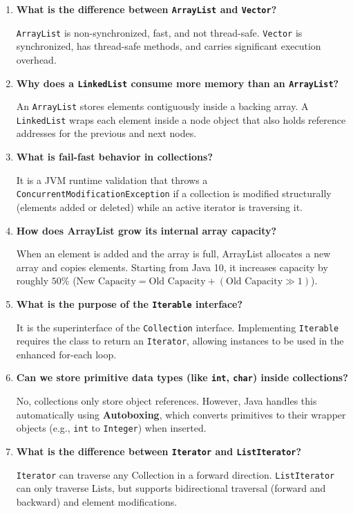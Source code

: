 \documentclass[12pt,a4paper]{article}
\newcommand{\Q}[1]{\textbf{#1}\par\noindent\ignorespaces}
\begin{document}
\begin{tcolorbox}[exambox, title={\textbf{Frequently Asked / Viva Questions}}]
\begin{enumerate}[leftmargin=*, label=\textbf{Q\arabic*.}, itemsep=5pt]
  \item \Q{What is the difference between \texttt{ArrayList} and \texttt{Vector}?}
        \texttt{ArrayList} is non-synchronized, fast, and not thread-safe. \texttt{Vector} is synchronized, has thread-safe methods, and carries significant execution overhead.
        
  \item \Q{Why does a \texttt{LinkedList} consume more memory than an \texttt{ArrayList}?}
        An \texttt{ArrayList} stores elements contiguously inside a backing array. A \texttt{LinkedList} wraps each element inside a node object that also holds reference addresses for the previous and next nodes.
        
  \item \Q{What is fail-fast behavior in collections?}
        It is a JVM runtime validation that throws a \texttt{ConcurrentModificationException} if a collection is modified structurally (elements added or deleted) while an active iterator is traversing it.
        
  \item \Q{How does ArrayList grow its internal array capacity?}
        When an element is added and the array is full, ArrayList allocates a new array and copies elements. Starting from Java 10, it increases capacity by roughly $50\%$ ($\text{New Capacity} = \text{Old Capacity} + (\text{Old Capacity} \gg 1)$).
        
  \item \Q{What is the purpose of the \texttt{Iterable} interface?}
        It is the superinterface of the \texttt{Collection} interface. Implementing \texttt{Iterable} requires the class to return an \texttt{Iterator}, allowing instances to be used in the enhanced for-each loop.
        
  \item \Q{Can we store primitive data types (like \texttt{int}, \texttt{char}) inside collections?}
        No, collections only store object references. However, Java handles this automatically using \textbf{Autoboxing}, which converts primitives to their wrapper objects (e.g., \texttt{int} to \texttt{Integer}) when inserted.
        
  \item \Q{What is the difference between \texttt{Iterator} and \texttt{ListIterator}?}
        \texttt{Iterator} can traverse any Collection in a forward direction. \texttt{ListIterator} can only traverse Lists, but supports bidirectional traversal (forward and backward) and element modifications.
        

\end{enumerate}
\end{tcolorbox}
\end{document}
